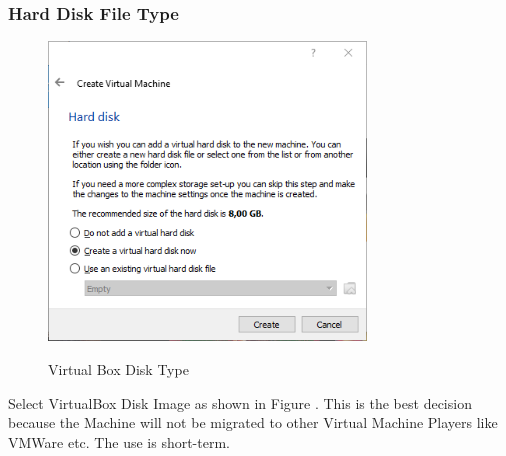 \subsubsection{Hard Disk File Type}
\begin{figure}[!htb]
    \centering
    \includegraphics[width=0.752\textwidth]{images/Win00-03.png}\\[0cm]  
    \caption[Windows Virtual Box]{Virtual Box Disk Type}
    \label{fig:00-04 - Windows Virtual Box Disk Type} 
\end{figure}
Select VirtualBox Disk Image as shown in Figure .
This is the best decision because the Machine will not be migrated to other
Virtual Machine Players like VMWare etc. The use is short-term.

